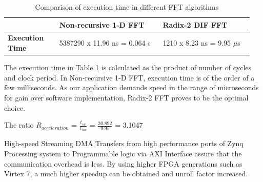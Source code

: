 \begin{table}[htbp]
\centering
\caption{Comparison of execution time in different FFT algorithms}
\label{tab:compare_fft}
\begin{tabular}{|m{0.2\linewidth}|m{0.4\linewidth}|m{0.35\linewidth}|}
\hline
 & \textbf{Non-recursive 1-D FFT} & \textbf{Radix-2 DIF FFT} \\ \hline
\textbf{Execution Time} & 5387290 x 11.96 ns = 0.064 s & 1210 x 8.23 ns = 9.95 $\mu$s \\ \hline
\end{tabular}
\end{table}
The execution time in Table \ref{tab:compare_fft} is calculated as the product of number of cycles and clock period. In Non-recursive 1-D FFT, execution time is of the order of a few milliseconds. As our application demands speed in the range of microseconds for gain over software implementation, Radix-2 FFT proves to be the optimal choice. \newline
\begin{adjustwidth}{2cm}{}
The ratio $R_{acceleration}$ = $\frac{t_{sw}}{t_{hw}}$ = $\frac{30.892}{9.95}$ = 3.1047\newline 
\end{adjustwidth} 
High-speed Streaming DMA Transfers from high performance ports of Zynq Processing system to Programmable logic via AXI Interface assure that the communication overhead is less. By using higher FPGA generations such as Virtex 7, a much higher speedup can be obtained and unroll factor increased. 